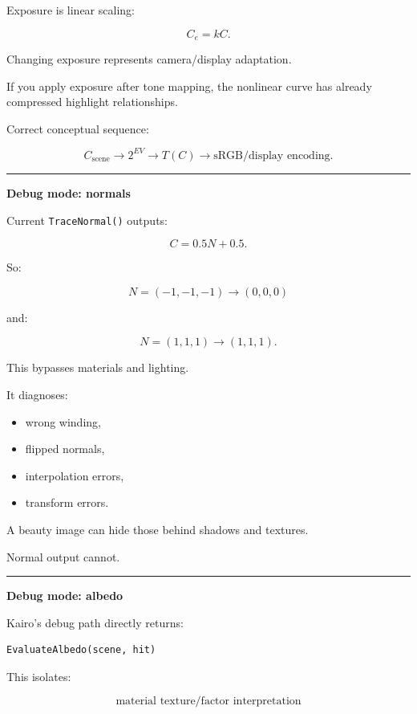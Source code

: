 Exposure is linear scaling:

\[
C_e=kC.
\]

Changing exposure represents camera/display adaptation.

If you apply exposure after tone mapping, the nonlinear curve has already compressed highlight relationships.

Correct conceptual sequence:

\[
\boxed{
C_{\text{scene}}
\rightarrow
2^{EV}
\rightarrow
T(C)
\rightarrow
\text{sRGB/display encoding}.
}
\]

\begin{center}\rule{0.5\linewidth}{0.5pt}\end{center}

\textbf{Debug mode: normals}

Current \texttt{TraceNormal()} outputs:

\[
\boxed{
C=
0.5N+0.5.
}
\]

So:

\[
N=(-1,-1,-1)
\rightarrow
(0,0,0)
\]

and:

\[
N=(1,1,1)
\rightarrow
(1,1,1).
\]

This bypasses materials and lighting.

It diagnoses:

\begin{itemize}
\tightlist
\item
  wrong winding,
\item
  flipped normals,
\item
  interpolation errors,
\item
  transform errors.
\end{itemize}

A beauty image can hide those behind shadows and textures.

Normal output cannot.

\begin{center}\rule{0.5\linewidth}{0.5pt}\end{center}

\textbf{Debug mode: albedo}

Kairo's debug path directly returns:

\begin{verbatim}
EvaluateAlbedo(scene, hit)
\end{verbatim}

This isolates:

\[
\text{material texture/factor interpretation}
\]

